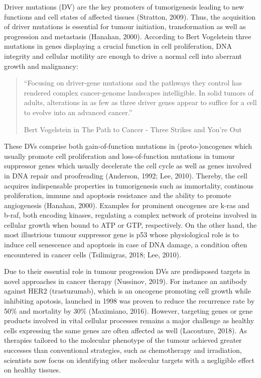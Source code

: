 \documentclass[]{article}
\begin{document}
Driver mutations (DV) are the key promoters of tumorigenesis leading to
new functions and cell states of affected tissues (Stratton, 2009).
Thus, the acquisition of driver mutations is essential for tumour
initiation, transformation as well as progression and metastasis
(Hanahan, 2000). According to Bert Vogelstein three mutations in genes
displaying a crucial function in cell proliferation, DNA integrity and
cellular motility are enough to drive a normal cell into aberrant growth
and malignancy:

\begin{quote}
``Focusing on driver-gene mutations and the pathways they control has
rendered complex cancer-genome landscapes intelligible. In solid tumors
of adults, alterations in as few as three driver genes appear to suffice
for a cell to evolve into an advanced cancer.''

Bert Vogelstein in The Path to Cancer - Three Strikes and You're Out
\end{quote}

These DVs comprise both gain-of-function mutations in (proto-)oncogenes
which usually promote cell proliferation and loss-of-function mutations
in tumour suppressor genes which usually decelerate the cell cycle as
well as genes involved in DNA repair and proofreading (Anderson, 1992;
Lee, 2010). Thereby, the cell acquires indispensable properties in
tumorigenesis such as immortality, continous proliferation, immune and
apoptosis resistance and the ability to promote angiogenesis (Hanahan,
2000). Examples for prominent oncogenes are k-ras and b-raf, both
encoding kinases, regulating a complex network of proteins involved in
cellular growth when bound to ATP or GTP, respectively. On the other
hand, the most illustrious tumour suppressor gene is p53 whose
physiological role is to induce cell senescence and apoptosis in case of
DNA damage, a condition often encountered in cancer cells (Tsilimigras,
2018; Lee, 2010).

Due to their essential role in tumour progression DVs are predisposed
targets in novel approaches in cancer therapy (Nussinov, 2019). For
instance an antibody against HER2 (trastuzumab), which is an oncogene
promoting cell growth while inhibiting apotosis, launched in 1998 was
proven to reduce the recurrence rate by 50\% and mortality by 30\%
(Maximiano, 2016). However, targeting genes or gene products involved in
vital cellular processes remains a major challenge as healthy cells
expressing the same genes are often affected as well (Lacouture, 2018).
As therapies tailored to the molecular phenotype of the tumour achieved
greater successes than conventional strategies, such as chemotherapy and
irradiation, scientists now focus on identifying other molecular targets
with a negligible effect on healthy tissues.
\end{document}
